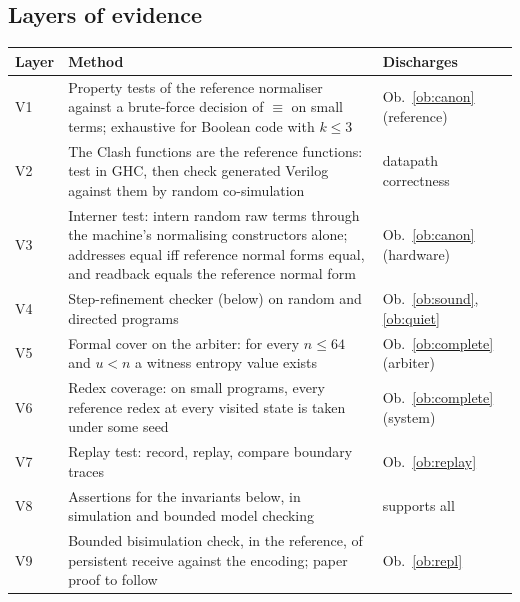 \documentclass[10.5pt,a4paper]{extarticle}
\newcommand{\scong}{\equiv}
\theoremstyle{definition}
\theoremstyle{remark}
\begin{document}
\subsection{Layers of evidence}

\noindent
\begin{tabularx}{\textwidth}{@{}l X X@{}}
\toprule
Layer & Method & Discharges\\
\midrule
V1 & Property tests of the reference normaliser against a brute-force
     decision of $\scong$ on small terms; exhaustive for Boolean code with
     $k \le 3$ & Ob.~\ref{ob:canon} (reference)\\
V2 & The Clash functions are the reference functions: test in GHC, then
     check generated Verilog against them by random co-simulation
     & datapath correctness\\
V3 & Interner test: intern random raw terms through the machine's normalising
     constructors alone; addresses equal iff reference normal forms equal,
     and readback equals the reference normal form & Ob.~\ref{ob:canon} (hardware)\\
V4 & Step-refinement checker (below) on random and directed programs
     & Ob.~\ref{ob:sound}, \ref{ob:quiet}\\
V5 & Formal cover on the arbiter: for every $n \le 64$ and $u<n$ a
     witness entropy value exists & Ob.~\ref{ob:complete} (arbiter)\\
V6 & Redex coverage: on small programs, every reference redex at every
     visited state is taken under some seed & Ob.~\ref{ob:complete} (system)\\
V7 & Replay test: record, replay, compare boundary traces
     & Ob.~\ref{ob:replay}\\
V8 & Assertions for the invariants below, in simulation and bounded
     model checking & supports all\\
V9 & Bounded bisimulation check, in the reference, of persistent receive
     against the encoding; paper proof to follow & Ob.~\ref{ob:repl}\\
\bottomrule
\end{tabularx}
\end{document}
